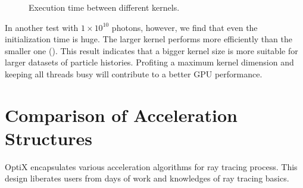 \begin{figure}
\centering
  \caption{Execution time between different kernels.}
  \label{fig:trillion}
\end{figure}

In another test with $1\times10^{10}$ photons, however, we find that even the initialization time is huge. The larger kernel performs more efficiently than the smaller one (). This result indicates that a bigger kernel size is more suitable for larger datasets of particle histories. Profiting a maximum kernel dimension and keeping all threads busy will contribute to a better GPU performance.

\section{Comparison of Acceleration Structures}
\label{acc}
OptiX encapsulates various acceleration algorithms for ray tracing process. This design liberates users from days of work and knowledges of ray tracing basics. 


